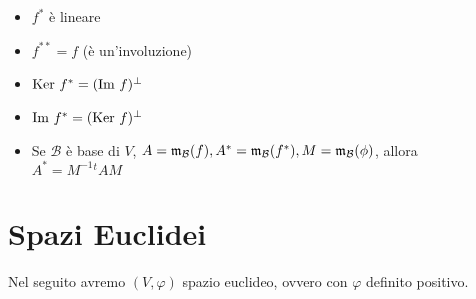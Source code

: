 \documentclass[a4paper,NoNotes,GeneralMath]{stdmdoc}
\begin{document}
	\begin{itemize}
		\item $f^{*}$ è lineare
		\item $f^{**} = f$ (è un'involuzione)
		\item $\mbox{Ker } f^{*} = (\mbox{Im } f)^\bot$
		\item $\mbox{Im } f^{*} = (\mbox{Ker } f)^\bot$
		\item Se $\mathcal{B}$ è base di $V$, $A = \mathfrak{m}_{\mathcal{B}}(f), A^{*} = \mathfrak{m}_{\mathcal{B}}(f^{*}), M = \mathfrak{m}_{\mathcal{B}}(\phi)$, allora $A^{*} = M^{-1}{}^tAM$
	\end{itemize}

	\section*{Spazi Euclidei}
	Nel seguito avremo $(V, \varphi)$ spazio euclideo, ovvero con $\varphi$ definito positivo.
\end{document}
